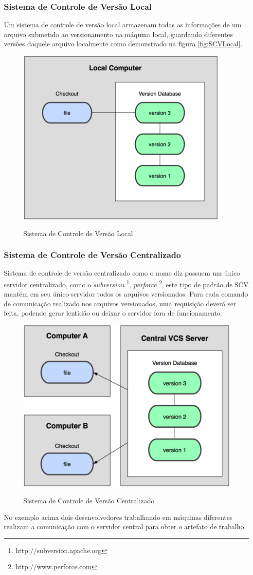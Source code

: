 \subsubsection{Sistema de Controle de Versão Local}
Um sistema de controle de versão local	armazenam todas as informações de um arquivo submetido ao versionamento na máquina local, guardando diferentes versões daquele arquivo localmente como demonstrado na figura \autoref{fig:SCVLocal}.
\begin{figure}[tbh]
\centering
\caption[Sistema de Controle de Versão Local]{Sistema de Controle de Versão Local}
\includegraphics[width=0.5\linewidth]{./images/scvlocal}
\label{fig:SCVLocal}
\end{figure}
\subsubsection{Sistema de Controle de Versão Centralizado} Sistema de controle de versão centralizado como o nome diz possuem um único servidor centralizado, como o \textit{subversion} \footnote{http://subversion.apache.org}, \textit{perforce} \footnote{http://www.perforce.com}, este tipo de padrão de SCV mantém em seu único servidor todos os arquivos versionados. Para cada comando de comunicação realizado nos arquivos versionados, uma requisição deverá ser feita, podendo gerar lentidão ou deixar o servidor fora de funcionamento.
\begin{figure}[tbh]
\centering
\caption[Sistema de Controle de Versão Centralizado]{Sistema de Controle de Versão Centralizado}
\includegraphics[width=0.5\linewidth]{./images/scvcentral}
\label{fig:SCVCentral}
\end{figure}
No exemplo acima dois desenvolvedores trabalhando em máquinas diferentes realizam a comunicação com o servidor central para obter o artefato de trabalho.	
